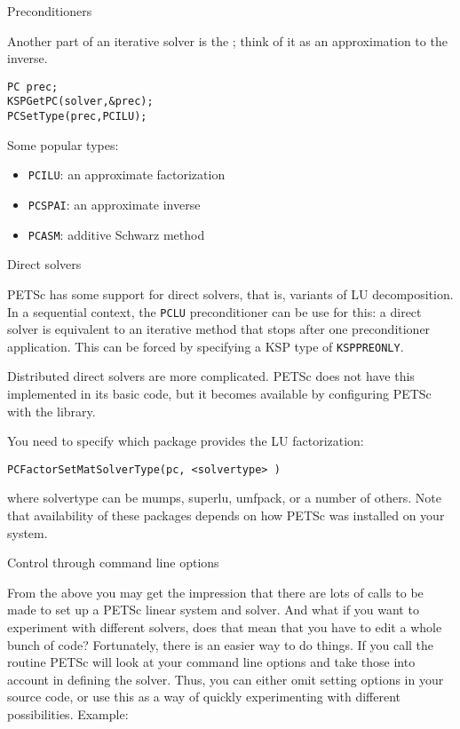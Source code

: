  {Preconditioners}

Another part of an iterative solver is the
; think of it as an approximation to the inverse.

\begin{lstlisting}
PC prec;
KSPGetPC(solver,&prec);
PCSetType(prec,PCILU);
\end{lstlisting}

Some popular types:
\begin{itemize}
\item \lstinline{PCILU}: an approximate factorization
\item \lstinline{PCSPAI}: an approximate inverse
\item \lstinline{PCASM}: additive Schwarz method
\end{itemize}

 {Direct solvers}

PETSc has some support for direct solvers, that is, variants of LU
decomposition. In a sequential context, the \lstinline{PCLU}
preconditioner can be use for this: a direct solver is equivalent to
an iterative method that stops after one preconditioner
application. This can be forced by specifying a KSP type of
\lstinline{KSPPREONLY}.

Distributed direct solvers are more complicated. PETSc does not have
this implemented in its basic code, but it becomes available by
configuring PETSc with the
 library.

You need to specify which package provides the LU factorization:

\begin{lstlisting}
PCFactorSetMatSolverType(pc, <solvertype> )
\end{lstlisting}

where solvertype can be mumps, superlu, umfpack, or a number of
others. Note that availability of these packages depends on how PETSc
was installed on your system.

 {Control through command line options}

From the above you may get the impression that there are lots of calls
to be made to set up a PETSc linear system and solver. And what if you
want to experiment with different solvers, does that mean that you
have to edit a whole bunch of code? Fortunately, there is an easier
way to do things. If you call the routine
%
%
PETSc will look at your command line options and take those into
account in defining the solver. Thus, you can either omit setting
options in your source code, or use this as a way of quickly
experimenting with different possibilities. Example:

